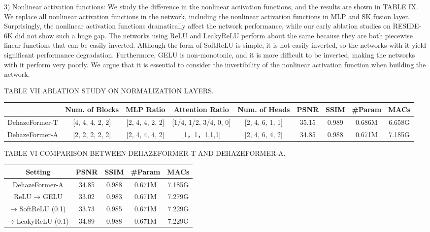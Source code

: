 3) Nonlinear activation functions: We study the difference in the nonlinear activation functions, and the results are shown in TABLE IX. We replace all nonlinear activation functions in the network, including the nonlinear activation functions in MLP and SK fusion layer. Surprisingly, the nonlinear activation functions dramatically affect the network performance, while our early ablation studies on RESIDE-6K did not show such a huge gap. The networks using ReLU and LeakyReLU perform about the same because they are both piecewise linear functions that can be easily inverted. Although the form of SoftReLU is simple, it is not easily inverted, so the networks with it yield significant performance degradation. Furthermore, GELU is non-monotonic, and it is more difficult to be inverted, making the networks with it perform very poorly. We argue that it is essential to consider the invertibility of the nonlinear activation function when building the network.

TABLE VII ABLATION STUDY ON NORMALIZATION LAYERS.


\begin{table}[htbp]
\centering
\begin{tabular}{|c|c|c|c|c|c|c|c|c|}\hline
 & Num. of Blocks & MLP Ratio & Attention Ratio & Num. of Heads & PSNR & SSIM & #Param & MACs \\ \hline
DehazeFormer-T & [4, 4, 4, 2, 2] & [2, 4, 4, 2, 2] & [1/4, 1/2, 3/4, 0, 0] & [2, 4, 6, 1, 1] & 35.15 & 0.989 & 0.686M & 6.658G \\ \hline
DehazeFormer-A & [2, 2, 2, 2, 2] & [2, 4, 4, 4, 2] & [1，1，1,1,1] & [2, 4, 6, 4, 2] & 34.85 & 0.988 & 0.671M & 7.185G \\ \hline
\end{tabular}\end{table}

TABLE VI COMPARISON BETWEEN DEHAZEFORMER-T AND DEHAZEFORMER-A.


\begin{table}[htbp]
\centering
\begin{tabular}{|c|c|c|c|c|}\hline
Setting & PSNR & SSIM & #Param & MACs \\ \hline
DehazeFormer-A & 34.85 & 0.988 & 0.671M & 7.185G \\ \hline
ReLU → GELU & 33.02 & 0.983 & 0.671M & 7.279G \\ \hline
→ SoftReLU (0.1) & 33.73 & 0.985 & 0.671M & 7.229G \\ \hline
→ LeakyReLU (0.1) & 34.89 & 0.988 & 0.671M & 7.229G \\ \hline
\end{tabular}\end{table}

